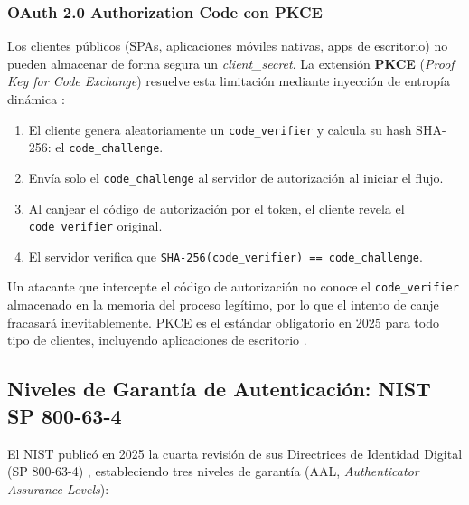 \documentclass[12pt, a4paper]{article}
\begin{document}
\subsubsection{OAuth 2.0 Authorization Code con PKCE}

Los clientes públicos (SPAs, aplicaciones móviles nativas, apps de escritorio)
no pueden almacenar de forma segura un \textit{client\_secret}. La extensión
\textbf{PKCE} (\textit{Proof Key for Code Exchange}) resuelve esta limitación
mediante inyección de entropía dinámica \cite{srivathsav2025}:

\begin{enumerate}[noitemsep]
  \item El cliente genera aleatoriamente un \texttt{code\_verifier} y calcula
        su hash SHA-256: el \texttt{code\_challenge}.
  \item Envía solo el \texttt{code\_challenge} al servidor de autorización al
        iniciar el flujo.
  \item Al canjear el código de autorización por el token, el cliente revela el
        \texttt{code\_verifier} original.
  \item El servidor verifica que \texttt{SHA-256(code\_verifier) == code\_challenge}.
\end{enumerate}

Un atacante que intercepte el código de autorización no conoce el
\texttt{code\_verifier} almacenado en la memoria del proceso legítimo, por lo que
el intento de canje fracasará inevitablemente. PKCE es el estándar obligatorio en
2025 para todo tipo de clientes, incluyendo aplicaciones de escritorio
\cite{hypr2025,srivathsav2025}.

\subsection{Niveles de Garantía de Autenticación: NIST SP 800-63-4}
\label{sec:nist}

El NIST publicó en 2025 la cuarta revisión de sus Directrices de Identidad
Digital (SP 800-63-4) \cite{nist80063}, estableciendo tres niveles de garantía
(AAL, \textit{Authenticator Assurance Levels}):
\end{document}

